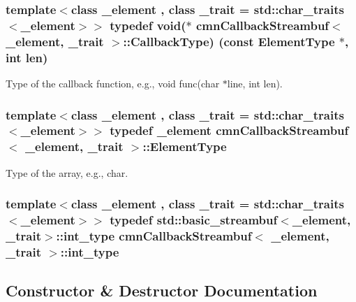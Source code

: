 \subsubsection[{Callback\+Type}]{\setlength{\rightskip}{0pt plus 5cm}template$<$class \+\_\+element , class \+\_\+trait  = std\+::char\+\_\+traits$<$\+\_\+element$>$$>$ typedef void($\ast$ {\bf cmn\+Callback\+Streambuf}$<$ \+\_\+element, \+\_\+trait $>$\+::Callback\+Type) (const {\bf Element\+Type} $\ast$, int len)}\label{classcmn_callback_streambuf_a606588225b2f37857213d2f3181119dd}
Type of the callback function, e.\+g., void func(char $\ast$line, int len). \hypertarget{classcmn_callback_streambuf_a3f220172226bbffc7cebefa8d458823a}{}
\subsubsection[{Element\+Type}]{\setlength{\rightskip}{0pt plus 5cm}template$<$class \+\_\+element , class \+\_\+trait  = std\+::char\+\_\+traits$<$\+\_\+element$>$$>$ typedef \+\_\+element {\bf cmn\+Callback\+Streambuf}$<$ \+\_\+element, \+\_\+trait $>$\+::{\bf Element\+Type}}\label{classcmn_callback_streambuf_a3f220172226bbffc7cebefa8d458823a}
Type of the array, e.\+g., char. \hypertarget{classcmn_callback_streambuf_a9599d576e1867902844cb4b5bf3150e8}{}
\subsubsection[{int\+\_\+type}]{\setlength{\rightskip}{0pt plus 5cm}template$<$class \+\_\+element , class \+\_\+trait  = std\+::char\+\_\+traits$<$\+\_\+element$>$$>$ typedef std\+::basic\+\_\+streambuf$<$\+\_\+element, \+\_\+trait$>$\+::{\bf int\+\_\+type} {\bf cmn\+Callback\+Streambuf}$<$ \+\_\+element, \+\_\+trait $>$\+::{\bf int\+\_\+type}}\label{classcmn_callback_streambuf_a9599d576e1867902844cb4b5bf3150e8}


\subsection{Constructor \& Destructor Documentation}
\hypertarget{classcmn_callback_streambuf_a09f93d86b52f31efb0387a7041f2ac6b}{}
